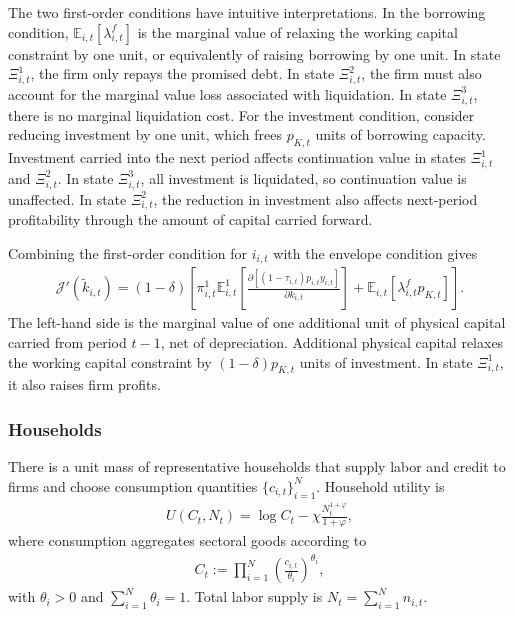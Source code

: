\documentclass[12pt]{article}
\numberwithin{equation}{section}
\begin{document}
The two first-order conditions have intuitive interpretations. In the borrowing condition, $\mathbb{E}_{i,t}\left[\lambda^f_{i,t}\right]$ is the marginal value of relaxing the working capital constraint by one unit, or equivalently of raising borrowing by one unit. In state $\Xi^1_{i,t}$, the firm only repays the promised debt. In state $\Xi^2_{i,t}$, the firm must also account for the marginal value loss associated with liquidation. In state $\Xi^3_{i,t}$, there is no marginal liquidation cost. For the investment condition, consider reducing investment by one unit, which frees $p_{K,t}$ units of borrowing capacity. Investment carried into the next period affects continuation value in states $\Xi^1_{i,t}$ and $\Xi^2_{i,t}$. In state $\Xi^3_{i,t}$, all investment is liquidated, so continuation value is unaffected. In state $\Xi^2_{i,t}$, the reduction in investment also affects next-period profitability through the amount of capital carried forward.

Combining the first-order condition for $i_{i,t}$ with the envelope condition gives
\begin{align}\label{eq:first_stage_envelope}
    \mathcal{J}'(\tilde{k}_{i,t}) = (1-\delta) \left[\pi^1_{i,t}\mathbb{E}^1_{i,t} \left[\frac{\partial [(1-\tau_{i,t})p_{i,t} y_{i,t}]}{\partial k_{i,t}}\right] + \mathbb{E}_{i,t} \left[\lambda^f_{i,t} p_{K,t}\right]\right].
\end{align}
The left-hand side is the marginal value of one additional unit of physical capital carried from period $t-1$, net of depreciation. Additional physical capital relaxes the working capital constraint by $(1-\delta)p_{K,t}$ units of investment. In state $\Xi^1_{i,t}$, it also raises firm profits.

\subsubsection{Households}

There is a unit mass of representative households that supply labor and credit to firms and choose consumption quantities $\{c_{i,t}\}_{i=1}^{N}$. Household utility is
\begin{align}\label{eq:hh_utility}
    U(C_t,N_t)
    =
    \log C_t
    -
    \chi\frac{N_t^{1+\varphi}}{1+\varphi},
\end{align}
where consumption aggregates sectoral goods according to
\begin{align*}
    C_t
    :=
    \prod_{i=1}^{N}
    \left(
        \frac{c_{i,t}}{\theta_i}
    \right)^{\theta_i},
\end{align*}
with $\theta_i>0$ and $\sum_{i=1}^N \theta_i=1$. Total labor supply is $N_t=\sum_{i=1}^{N}n_{i,t}$.
\end{document}
